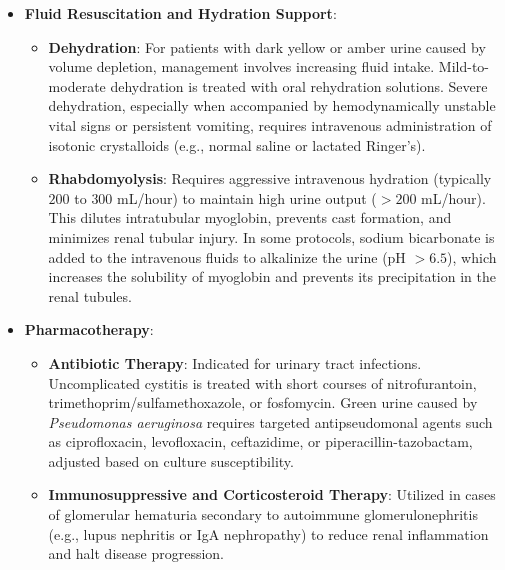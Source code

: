 \begin{itemize}
  \item \textbf{Fluid Resuscitation and Hydration Support}:
  \begin{itemize}
    \item \textbf{Dehydration}: For patients with dark yellow or amber urine caused by volume depletion, management involves increasing fluid intake. Mild-to-moderate dehydration is treated with oral rehydration solutions. Severe dehydration, especially when accompanied by hemodynamically unstable vital signs or persistent vomiting, requires intravenous administration of isotonic crystalloids (e.g., normal saline or lactated Ringer's).
    \item \textbf{Rhabdomyolysis}: Requires aggressive intravenous hydration (typically $200$ to $300$ mL/hour) to maintain high urine output ($>200$ mL/hour). This dilutes intratubular myoglobin, prevents cast formation, and minimizes renal tubular injury. In some protocols, sodium bicarbonate is added to the intravenous fluids to alkalinize the urine (pH $>6.5$), which increases the solubility of myoglobin and prevents its precipitation in the renal tubules.
  \end{itemize}

  \item \textbf{Pharmacotherapy}:
  \begin{itemize}
    \item \textbf{Antibiotic Therapy}: Indicated for urinary tract infections. Uncomplicated cystitis is treated with short courses of nitrofurantoin, trimethoprim/sulfamethoxazole, or fosfomycin. Green urine caused by \textit{Pseudomonas aeruginosa} requires targeted antipseudomonal agents such as ciprofloxacin, levofloxacin, ceftazidime, or piperacillin-tazobactam, adjusted based on culture susceptibility.
    \item \textbf{Immunosuppressive and Corticosteroid Therapy}: Utilized in cases of glomerular hematuria secondary to autoimmune glomerulonephritis (e.g., lupus nephritis or IgA nephropathy) to reduce renal inflammation and halt disease progression.
  \end{itemize}


\end{itemize}
